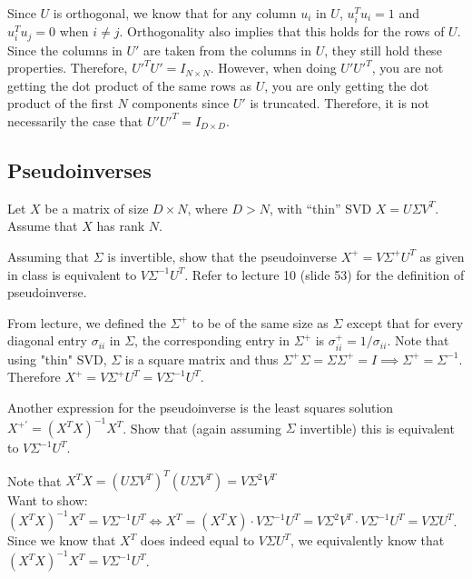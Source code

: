 \begin{solution}
	Since $U$ is orthogonal, we know that for any column $u_i$ in $U$, $u_{i}^{T}u_{i} = 1$ and $u_{i}^{T}u_{j} = 0$ when $i \neq j$. Orthogonality also implies that this holds for the rows of $U$. Since the columns in $U'$ are taken from the columns in $U$, they still hold these properties. Therefore, $U'^TU' = I_{N \times N}$. However, when doing $U'U'^T$, you are not getting the dot product of the same rows as $U$, you are only getting the dot product of the first $N$ components since $U'$ is truncated. Therefore, it is not necessarily the case that $U'U'^T = I_{D \times D}$. 
\end{solution}

\newpage
\subsection{Pseudoinverses} Let $X$ be a matrix of size $D \times N$, where $D > N$, with ``thin'' SVD $X = U\Sigma V^T$. Assume that $X$ has rank $N$.

\problem[4] Assuming that $\Sigma$ is invertible, show that the pseudoinverse $X^+ = V\Sigma^+ U^T$ as given in class is equivalent to $V\Sigma^{-1} U^T$. Refer to lecture 10 (slide 53) for the definition of pseudoinverse.

\begin{solution}
	From lecture, we defined the $\Sigma^+$ to be of the same size as $\Sigma$ except that for every diagonal entry $\sigma_{ii}$ in $\Sigma$, the corresponding entry in $\Sigma^+$ is $\sigma_{ii}^+ = 1/\sigma_{ii}$. Note that using "thin" SVD, $\Sigma$ is a square matrix and thus $\Sigma^+\Sigma = \Sigma\Sigma^+ = I \implies \Sigma^+ = \Sigma^{-1}$. Therefore $X^+ = V\Sigma^+U^T = V\Sigma^{-1}U^T$.
\end{solution}

\problem[4] Another expression for the pseudoinverse is the least squares solution $X^{+'} = (X^T X)^{-1}X^T$. Show that (again assuming $\Sigma$ invertible) this is equivalent to $V\Sigma^{-1}U^T$.
\begin{solution}
	Note that $X^TX = (U\Sigma V^T)^T (U\Sigma V^T) = V\Sigma^2V^T$ \\ 
	Want to show: $ (X^TX)^{-1}X^T = V\Sigma^{-1}U^T \iff X^T = (X^TX) \cdot V\Sigma^{-1}U^T =  V\Sigma^2V^T \cdot V\Sigma^{-1}U^T = V\Sigma U^T$. Since we know that $X^T$ does indeed equal to $V\Sigma U^T$, we equivalently know that $(X^TX)^{-1}X^T = V\Sigma^{-1}U^T$.
\end{solution}

